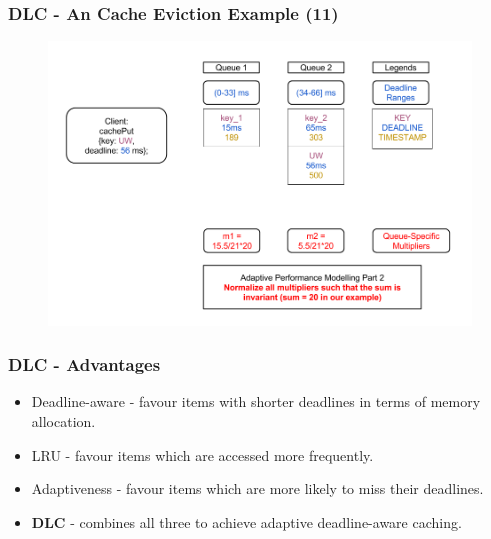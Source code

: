 \documentclass{beamer}
\newcommand{\myv}{\vspace{3 mm}}
\begin{document}
\begin{frame}
  \frametitle{DLC - An Cache Eviction Example (11)}
  \begin{figure}
    \begin{center}
      \centerline{\includegraphics[scale=0.33]{img/DLC_V5_11.png}}
    \end{center}
  \end{figure}
\end{frame}


\begin{frame}
  \frametitle{DLC - Advantages}
  \vspace{-15 mm}
  \begin{itemize}
  \item Deadline-aware - favour items with shorter deadlines in terms
    of memory allocation. \myv
  \item LRU - favour items which are accessed more frequently. \myv
  \item Adaptiveness - favour items which are more likely to miss their
    deadlines.  \myv
  \item \textbf{DLC} - combines all three to achieve adaptive deadline-aware caching.
  \end{itemize}
\end{frame}
\end{document}
